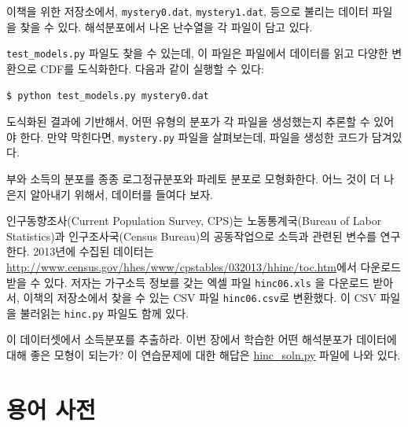 \begin{exercise}
이책을 위한 저장소에서, {\tt mystery0.dat}, 
{\tt mystery1.dat}, 등으로 불리는 데이터 파일을 찾을 수 있다.
해석분포에서 나온 난수열을 각 파일이 담고 있다.


\verb"test_models.py" 파일도 찾을 수 있는데, 이 파일은
파일에서 데이터를 읽고 다양한 변환으로 CDF를 도식화한다.
다음과 같이 실행할 수 있다:

\begin{verbatim}
$ python test_models.py mystery0.dat
\end{verbatim}

도식화된 결과에 기반해서, 어떤 유형의 분포가 각 파일을 생성했는지 추론할 수 있어야 한다.
만약 막힌다면, {\tt mystery.py} 파일을 살펴보는데, 파일을 생성한 코드가 담겨있다.

\end{exercise}


\begin{exercise}
\label{income}

부와 소득의 분포를 종종 로그정규분포와 파레토 분포로 모형화한다.
어느 것이 더 나은지 알아내기 위해서, 데이터를 들여다 보자.

인구동향조사(Current Population Survey, CPS)는 노동통계국(Bureau of Labor Statistics)과 
인구조사국(Census Bureau)의 공동작업으로 소득과 관련된 변수를 연구한다.
2013년에 수집된 데이터는 \url{http://www.census.gov/hhes/www/cpstables/032013/hhinc/toc.htm}에서 다운로드 받을 수 있다.
저자는 가구소득 정보를 갖는 엑셀 파일 {\tt hinc06.xls} 을 다운로드 받아서,
이책의 저장소에서 찾을 수 있는 CSV 파일 {\tt hinc06.csv}로 변환했다.
이 CSV 파일을 불러읽는 {\tt hinc.py} 파일도 함께 있다.


이 데이터셋에서 소득분포를 추출하라. 이번 장에서 학습한 어떤 해석분포가 데이터에 대해 좋은 모형이 되는가?
이 연습문제에 대한 해답은 \url{hinc_soln.py} 파일에 나와 있다.

\end{exercise}




\section{용어 사전}

